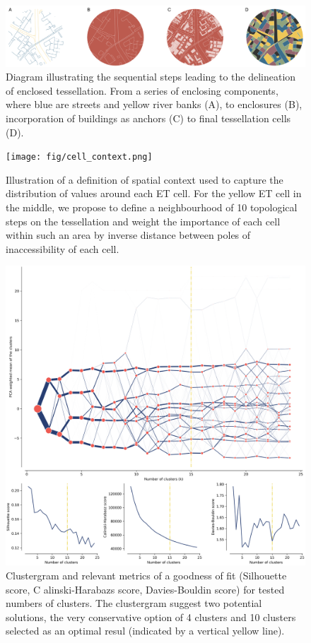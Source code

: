 \documentclass[fleqn,10pt]{wlscirep}
\begin{document}
\begin{figure}[ht]
    \includegraphics[width=\linewidth]{fig/et_diagram.pdf}
    \caption{Diagram illustrating the sequential steps leading to the delineation of
    enclosed tessellation. From a series of enclosing components, where blue are streets
    and yellow river banks (A), to enclosures (B), incorporation of buildings as anchors
    (C) to final tessellation cells (D).}
    \label{fig:et_diagram}
\end{figure}

\begin{figure}[ht]
    \centering
    \texttt{[image: fig/cell\_context.png]}
    \caption{Illustration of a definition of spatial context used to capture the
    distribution of values around each ET cell. For the yellow ET cell in the middle,
    we propose to define a neighbourhood of 10 topological steps on the tessellation
    and weight the importance of each cell within such an area by inverse distance
    between poles of inaccessibility of each cell.}
    \label{fig:context}
\end{figure}

\begin{figure}[ht]
    \centering
    \includegraphics[width=.8\linewidth]{fig/clustergram.png}
    \caption{Clustergram and relevant metrics of a goodness of fit (Silhouette score, C
    alinski-Harabazs score, Davies-Bouldin score) for tested numbers of clusters. The
    clustergram suggest two potential solutions, the very conservative option of 4
    clusters and 10 clusters selected as an optimal resul (indicated by a vertical yellow line).}
    \label{fig:clustergram}
\end{figure}
\end{document}
